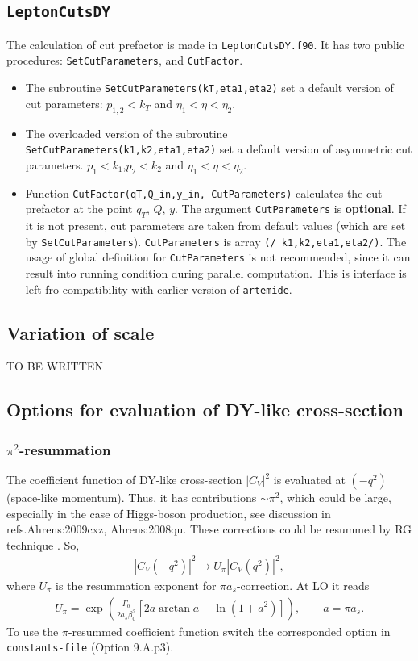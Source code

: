 \documentclass[prd,nofootinbib,eqsecnum,final]{revtex4}
\renewcommand{\(}{\left(}
\renewcommand{\)}{\right)}
\renewcommand{\[}{\left[}
\renewcommand{\]}{\right]}
\begin{document}
\subsection{\texttt{LeptonCutsDY}}

The calculation of cut prefactor is made in \texttt{LeptonCutsDY.f90}. It has two public procedures: \texttt{SetCutParameters}, and \texttt{CutFactor}. 
\begin{itemize}
\item The subroutine \texttt{SetCutParameters(kT,eta1,eta2)} set a default version of cut parameters: $p_{1,2}<k_T$ and $\eta_1<\eta<\eta_2$.
\item The overloaded version of the subroutine \texttt{SetCutParameters(k1,k2,eta1,eta2)} set a default version of asymmetric cut parameters. $p_{1}<k_1$,$p_2<k_2$ and $\eta_1<\eta<\eta_2$.
\item Function \texttt{CutFactor(qT,Q\_in,y\_in, CutParameters)} calculates the cut prefactor at the point $q_T$, $Q$, $y$. The argument \texttt{CutParameters} is \textbf{optional}. If it is not present, cut parameters are taken from default values (which are set by \texttt{SetCutParameters}). \texttt{CutParameters} is array \texttt{(/ k1,k2,eta1,eta2/)}. The usage of global definition for \texttt{CutParameters} is not recommended, since it can result into running condition during parallel computation. This is interface is left fro compatibility with earlier version of \texttt{artemide}.
\end{itemize} 

\subsection{Variation of scale}
\label{TMDX:c2}

TO BE WRITTEN

\subsection{Options for evaluation of DY-like cross-section}

\subsubsection{$\pi^2$-resummation}

The coefficient function of DY-like cross-section $|C_V|^2$ is evaluated at $(-q^2)$ (space-like momentum). Thus, it has contributions $\sim \pi^2$, which could be large, especially in the case of Higgs-boson production, see discussion in  refs.{Ahrens:2009cxz, Ahrens:2008qu}. These corrections could be resummed by RG technique \cite{Ahrens:2008qu}. So,
\begin{eqnarray}
|C_V(-q^2)|^2\to U_\pi |C_V(q^2)|^2,
\end{eqnarray}
where $U_\pi$ is the resummation exponent for $\pi a_s$-correction. At LO it reads \cite{Ahrens:2008qu}
\begin{eqnarray}
U_\pi=\exp\(\frac{\Gamma_0}{2a_s\beta_0^2}[2 a \arctan a-\ln(1+a^2)]\),\qquad a=\pi a_s.
\end{eqnarray}
To use the $\pi$-resummed coefficient function switch the corresponded option in \texttt{constants-file} (Option 9.A.p3).
\end{document}
